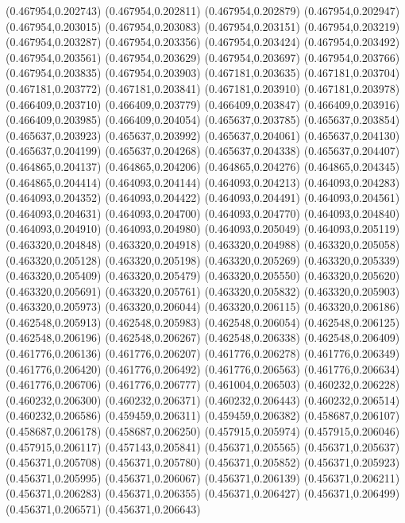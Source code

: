 (0.467954,0.202743)
(0.467954,0.202811)
(0.467954,0.202879)
(0.467954,0.202947)
(0.467954,0.203015)
(0.467954,0.203083)
(0.467954,0.203151)
(0.467954,0.203219)
(0.467954,0.203287)
(0.467954,0.203356)
(0.467954,0.203424)
(0.467954,0.203492)
(0.467954,0.203561)
(0.467954,0.203629)
(0.467954,0.203697)
(0.467954,0.203766)
(0.467954,0.203835)
(0.467954,0.203903)
(0.467181,0.203635)
(0.467181,0.203704)
(0.467181,0.203772)
(0.467181,0.203841)
(0.467181,0.203910)
(0.467181,0.203978)
(0.466409,0.203710)
(0.466409,0.203779)
(0.466409,0.203847)
(0.466409,0.203916)
(0.466409,0.203985)
(0.466409,0.204054)
(0.465637,0.203785)
(0.465637,0.203854)
(0.465637,0.203923)
(0.465637,0.203992)
(0.465637,0.204061)
(0.465637,0.204130)
(0.465637,0.204199)
(0.465637,0.204268)
(0.465637,0.204338)
(0.465637,0.204407)
(0.464865,0.204137)
(0.464865,0.204206)
(0.464865,0.204276)
(0.464865,0.204345)
(0.464865,0.204414)
(0.464093,0.204144)
(0.464093,0.204213)
(0.464093,0.204283)
(0.464093,0.204352)
(0.464093,0.204422)
(0.464093,0.204491)
(0.464093,0.204561)
(0.464093,0.204631)
(0.464093,0.204700)
(0.464093,0.204770)
(0.464093,0.204840)
(0.464093,0.204910)
(0.464093,0.204980)
(0.464093,0.205049)
(0.464093,0.205119)
(0.463320,0.204848)
(0.463320,0.204918)
(0.463320,0.204988)
(0.463320,0.205058)
(0.463320,0.205128)
(0.463320,0.205198)
(0.463320,0.205269)
(0.463320,0.205339)
(0.463320,0.205409)
(0.463320,0.205479)
(0.463320,0.205550)
(0.463320,0.205620)
(0.463320,0.205691)
(0.463320,0.205761)
(0.463320,0.205832)
(0.463320,0.205903)
(0.463320,0.205973)
(0.463320,0.206044)
(0.463320,0.206115)
(0.463320,0.206186)
(0.462548,0.205913)
(0.462548,0.205983)
(0.462548,0.206054)
(0.462548,0.206125)
(0.462548,0.206196)
(0.462548,0.206267)
(0.462548,0.206338)
(0.462548,0.206409)
(0.461776,0.206136)
(0.461776,0.206207)
(0.461776,0.206278)
(0.461776,0.206349)
(0.461776,0.206420)
(0.461776,0.206492)
(0.461776,0.206563)
(0.461776,0.206634)
(0.461776,0.206706)
(0.461776,0.206777)
(0.461004,0.206503)
(0.460232,0.206228)
(0.460232,0.206300)
(0.460232,0.206371)
(0.460232,0.206443)
(0.460232,0.206514)
(0.460232,0.206586)
(0.459459,0.206311)
(0.459459,0.206382)
(0.458687,0.206107)
(0.458687,0.206178)
(0.458687,0.206250)
(0.457915,0.205974)
(0.457915,0.206046)
(0.457915,0.206117)
(0.457143,0.205841)
(0.456371,0.205565)
(0.456371,0.205637)
(0.456371,0.205708)
(0.456371,0.205780)
(0.456371,0.205852)
(0.456371,0.205923)
(0.456371,0.205995)
(0.456371,0.206067)
(0.456371,0.206139)
(0.456371,0.206211)
(0.456371,0.206283)
(0.456371,0.206355)
(0.456371,0.206427)
(0.456371,0.206499)
(0.456371,0.206571)
(0.456371,0.206643)
